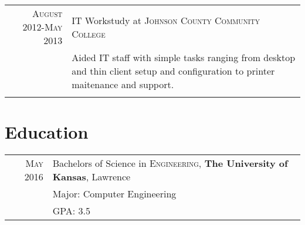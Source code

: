 \documentclass[10pt]{article} %
\begin{document}
\begin{tabular}{r|p{11cm}}
\textsc{August 2012-May 2013} & IT Workstudy at \textsc{Johnson County Community College} \\
& \footnotesize{Aided IT staff with simple tasks ranging from desktop and thin client setup and configuration to printer 
 maitenance and support.}\\
\multicolumn{2}{c}{} \\
\end{tabular}



\section{Education}

\begin{table}[h]
\centering
\begin{tabular}{rl}	
\textsc{May} 2016 & Bachelors of Science in \textsc{Engineering}, \textbf{The University of Kansas}, Lawrence\\
& Major: Computer Engineering \\
&\normalsize \textsc{GPA}: 3.5\\
\end{tabular}
\end{table}


\end{document}
